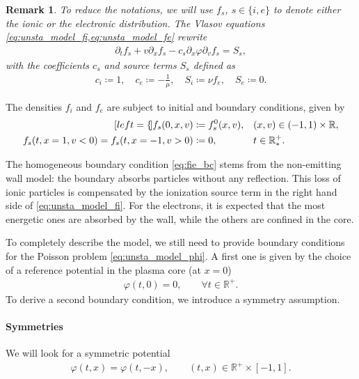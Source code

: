\documentclass{article}
\newtheorem{remarque}{Remark}[section]
\numberwithin{equation}{section}
\newcommand{\R}{\mathbb{R}}
\newcommand{\mysubeq}[2]{ %
	\begin{subequations}\label{#1}
		\begin{align}[left = {\empheqlbrace}]
			#2
		\end{align}
	\end{subequations}	
}
\begin{document}
\begin{remarque}
	To reduce the notations, we will use $f_s$, $s\in\{i,e\}$ to denote either the ionic or the electronic distribution. The Vlasov equations \cref{eq:unsta_model_fi,eq:unsta_model_fe} rewrite 
	\begin{align*}
		\partial_t f_s + v \partial_x f_s - c_s \partial_x \varphi \partial_v f_s = S_s,
	\end{align*}
	with the coefficients $c_s$ and source terms $S_s$ defined as
	\begin{align*}
		c_i \coloneqq 1, \quad c_e \coloneqq -\frac{1}{\mu}, \quad S_i \coloneqq \nu f_e, \quad S_e \coloneqq 0.
	\end{align*}
\end{remarque}

The densities $f_i$ and $f_e$ are subject to initial and boundary conditions, given by
\mysubeq{eq:unsta_model_bc}{
	f_{s}(0,x,v) &\coloneqq f_{s}^0(x,v), && (x,v) \in (-1,1) \times \R, \label{eq:init} \\
	f_{s}(t,x=1,v < 0) = f_{s}(t,x=-1,v > 0) &\coloneqq 0,  && t \in \R^+_*. \label{eq:fie_bc}
}
The homogeneous boundary condition \cref{eq:fie_bc} stems from the non-emitting wall model: the boundary absorbs particles without any reflection. This loss of ionic particles is compensated by the ionization source term in the right hand side of \eqref{eq:unsta_model_fi}. For the electrons, it is expected that the most energetic ones are absorbed by the wall, while the others are confined in the core. 

To completely describe the model, we still need to provide boundary conditions for the Poisson problem \cref{eq:unsta_model_phi}. A first one is given by the choice of a reference potential in the plasma core (at $x=0$)
\begin{align}
	\varphi(t,0) = 0, \quad \quad \forall t \in \R^+. \label{eq:phi_nul_0}
\end{align}
To derive a second boundary condition, we introduce a symmetry assumption.

\paragraph{Symmetries}

We will look for a %
symmetric potential
\begin{align}\label{eq:phi_is_pair}
	\varphi(t,x) = \varphi (t,-x), \quad \quad (t,x) \in \R^+ \times [-1,1].
\end{align}
\end{document}
